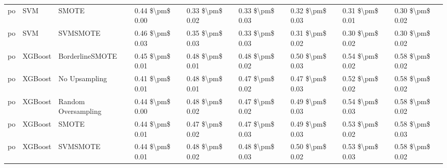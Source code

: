 \begin{tabular}{lllllllll}
      po &                             SVM &                         SMOTE & 0.44 \$\textbackslash pm\$ 0.00 &           0.33 \$\textbackslash pm\$ 0.02 &       0.33 \$\textbackslash pm\$ 0.03 &        0.32 \$\textbackslash pm\$ 0.03 &                         0.31 \$\textbackslash pm\$ 0.01 &     0.30 \$\textbackslash pm\$ 0.02 \\
      po &                             SVM &                      SVMSMOTE & 0.46 \$\textbackslash pm\$ 0.03 &           0.35 \$\textbackslash pm\$ 0.03 &       0.33 \$\textbackslash pm\$ 0.03 &        0.31 \$\textbackslash pm\$ 0.02 &                         0.30 \$\textbackslash pm\$ 0.02 &     0.30 \$\textbackslash pm\$ 0.02 \\
      po &                         XGBoost &               BorderlineSMOTE & 0.45 \$\textbackslash pm\$ 0.01 &           0.48 \$\textbackslash pm\$ 0.01 &       0.48 \$\textbackslash pm\$ 0.02 &        0.50 \$\textbackslash pm\$ 0.03 &                         0.54 \$\textbackslash pm\$ 0.02 &     0.58 \$\textbackslash pm\$ 0.02 \\
      po &                         XGBoost &                 No Upsampling & 0.41 \$\textbackslash pm\$ 0.01 &           0.48 \$\textbackslash pm\$ 0.01 &       0.47 \$\textbackslash pm\$ 0.02 &        0.47 \$\textbackslash pm\$ 0.03 &                         0.52 \$\textbackslash pm\$ 0.02 &     0.58 \$\textbackslash pm\$ 0.02 \\
      po &                         XGBoost &           Random Oversampling & 0.44 \$\textbackslash pm\$ 0.00 &           0.48 \$\textbackslash pm\$ 0.02 &       0.47 \$\textbackslash pm\$ 0.02 &        0.49 \$\textbackslash pm\$ 0.03 &                         0.54 \$\textbackslash pm\$ 0.03 &     0.58 \$\textbackslash pm\$ 0.02 \\
      po &                         XGBoost &                         SMOTE & 0.44 \$\textbackslash pm\$ 0.01 &           0.47 \$\textbackslash pm\$ 0.02 &       0.47 \$\textbackslash pm\$ 0.03 &        0.49 \$\textbackslash pm\$ 0.03 &                         0.53 \$\textbackslash pm\$ 0.02 &     0.58 \$\textbackslash pm\$ 0.03 \\
      po &                         XGBoost &                      SVMSMOTE & 0.44 \$\textbackslash pm\$ 0.01 &           0.48 \$\textbackslash pm\$ 0.02 &       0.48 \$\textbackslash pm\$ 0.03 &        0.50 \$\textbackslash pm\$ 0.02 &                         0.53 \$\textbackslash pm\$ 0.03 &     0.58 \$\textbackslash pm\$ 0.02 \\

\end{tabular}
